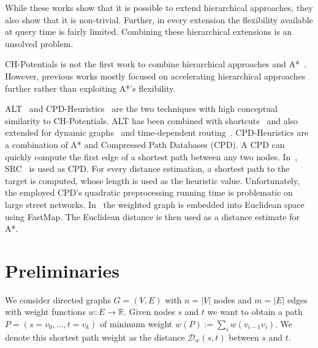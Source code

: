 \documentclass[manuscript,review]{acmart}
\newcommand*{\dist}{\mathcal{D}}
\begin{document}
While these works show that it is possible to extend hierarchical approaches, they also show that it is non-trivial.
Further, in every extension the flexibility available at query time is fairly limited.
Combining these hierarchical extensions is an unsolved problem.

CH-Potentials is not the first work to combine hierarchical approaches and A*~\cite{bdsssw-chgds-10,gkw-blwr-07,bdgwz-sfpcs-19}.
However, previous works mostly focused on accelerating hierarchical approaches further rather than exploiting A*'s flexibility.

ALT~\cite{gh-cspas-05,gw-cppsp-05} and CPD-Heuristics~\cite{DBLP:conf/ijcai/BonoGHS19} are the two techniques with high conceptual similarity to CH-Potentials.
ALT has been combined with shortcuts~\cite{bdsssw-chgds-10} and also extended for dynamic graphs~\cite{dw-lbrdg-07} and time-dependent routing~\cite{ndls-bastd-12,dn-crdtd-12}.
%
CPD-Heuristics are a combination of A* and Compressed Path Databases (CPD).
A CPD can quickly compute the first edge of a shortest path between any two nodes.
In~\cite{DBLP:conf/ijcai/BonoGHS19}, SRC~\cite{DBLP:conf/socs/StrasserHB14} is used as CPD.
For every distance estimation, a shortest path to the target is computed, whose length is used as the heuristic value.
Unfortunately, the employed CPD's quadratic preprocessing running time is problematic on large street networks.
%
%
In~\cite{DBLP:conf/ijcai/0002UJAKK18} the weighted graph is embedded into Euclidean space using FastMap. %
The Euclidean distance is then used as a distance estimate for A*.


\section{Preliminaries}\label{sec:preliminaries}

We consider directed graphs $G=(V,E)$ with $n=|V|$ nodes and $m=|E|$ edges with weight functions $w : E \to \mathbb{R}$.
Given nodes $s$ and $t$ we want to obtain a path $P=(s=v_0,\dots,t=v_k)$ of minimum weight $w(P) := \sum_{i} w(v_{i-1}v_i)$.
We denote this shortest path weight as the distance $\dist_w(s,t)$ between $s$ and $t$.
\end{document}
